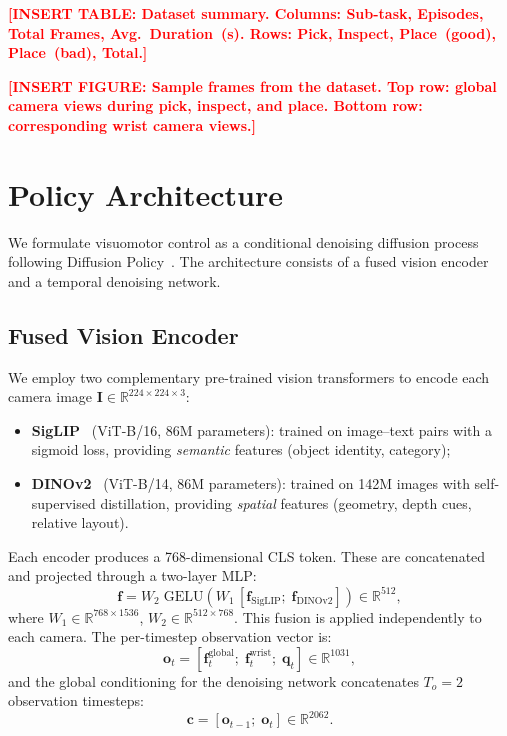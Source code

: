 \documentclass[conference]{IEEEtran}
\newcommand{\placeholder}[1]{\textcolor{red}{\textbf{[#1]}}}
\begin{document}
\placeholder{INSERT TABLE: Dataset summary. Columns: Sub-task, Episodes, Total Frames, Avg.\ Duration~(s). Rows: Pick, Inspect, Place~(good), Place~(bad), Total.}

\placeholder{INSERT FIGURE: Sample frames from the dataset. Top row: global camera views during pick, inspect, and place. Bottom row: corresponding wrist camera views.}

\section{Policy Architecture}
\label{sec:policy}

We formulate visuomotor control as a conditional denoising diffusion process following Diffusion Policy~\cite{chi2023diffusion}. The architecture consists of a fused vision encoder and a temporal denoising network.

\subsection{Fused Vision Encoder}
\label{sec:vision}

We employ two complementary pre-trained vision transformers to encode each camera image $\mathbf{I} \in \mathbb{R}^{224\times 224\times 3}$:
\begin{itemize}
    \item \textbf{SigLIP}~\cite{zhai2023siglip} (ViT-B/16, 86M parameters): trained on image--text pairs with a sigmoid loss, providing \emph{semantic} features (object identity, category);
    \item \textbf{DINOv2}~\cite{oquab2024dinov2} (ViT-B/14, 86M parameters): trained on 142M images with self-supervised distillation, providing \emph{spatial} features (geometry, depth cues, relative layout).
\end{itemize}

Each encoder produces a 768-dimensional CLS token. These are concatenated and projected through a two-layer MLP:
\begin{equation}
\label{eq:vision}
\mathbf{f} = W_2\;\mathrm{GELU}\!\left(W_1\,[\mathbf{f}_\mathrm{SigLIP};\;\mathbf{f}_\mathrm{DINOv2}]\right) \in \mathbb{R}^{512},
\end{equation}
where $W_1 \in \mathbb{R}^{768\times 1536}$, $W_2 \in \mathbb{R}^{512\times 768}$. This fusion is applied independently to each camera. The per-timestep observation vector is:
\begin{equation}
\label{eq:obs}
\mathbf{o}_t = [\mathbf{f}_t^\mathrm{global};\;\mathbf{f}_t^\mathrm{wrist};\;\mathbf{q}_t] \in \mathbb{R}^{1031},
\end{equation}
and the global conditioning for the denoising network concatenates $T_o = 2$ observation timesteps:
\begin{equation}
\label{eq:cond}
\mathbf{c} = [\mathbf{o}_{t-1};\;\mathbf{o}_t] \in \mathbb{R}^{2062}.
\end{equation}
\end{document}
